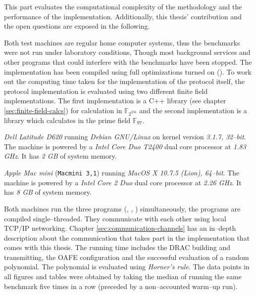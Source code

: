 \label{sec:evaluation}

This part evaluates the computational complexity of the methodology and the
performance of the implementation. Additionally, this thesis' contribution and
the open questions are exposed in the following.

%
%
\label{sec:test-setup}

\label{sec:test-machines}

Both test machines are regular home computer systems, thus the benchmarks were
not run under laboratory conditions, Though most background services and other
programs that could interfere with the benchmarks have been stopped. The
implementation has been compiled using full optimizations turned on
(). To work out the computing time
taken for the implementation of the protocol itself, the protocol implementation
is evaluated using two different finite field implementations.
The first implementation is a C++ library (see chapter
\ref{sec:finite-field-calcs}) for calculation in $\mathbb{F}_{2^{256}}$ and the
second implementation is a \JWThaskell{} library which calculates in the prime
field $\mathbb{F}_{97}$.



\emph{Dell Latitude D620} running \emph{Debian GNU/Linux} on kernel version
\emph{3.1.7, 32--bit}. The machine is powered by a \emph{Intel\TReg{} Core Duo
T2400} dual core processor at \emph{1.83 GHz}. It has \emph{2 GB} of system
memory.



\emph{Apple Mac mini} (\texttt{Macmini 3,1}) running \emph{MacOS X 10.7.5
(Lion), 64--bit}. The machine is powered by a \emph{Intel\TReg{} Core 2 Duo}
dual core processor at \emph{2.26 GHz}. It has \emph{8 GB} of system memory.


Both machines run the three programs (\JWBpOne{}, \JWBpTwo{}, \JWBtoken{})
simultaneously, the programs are compiled single--threaded. They
communicate with each other using local TCP/IP networking. Chapter
\ref{sec:communication-channels} has an in--depth description about the
communication that takes part in the implementation that comes with this thesis.
The running time includes the DRAC building and transmitting, the OAFE
configuration and the successful evaluation of a random polynomial. The
polynomial is evaluated using \emph{Horner's rule}\cite{cormen01}. The data
points in all figures and tables were obtained by taking the median of
running the same benchmark five times in a row (preceded by a non--accounted
warm--up run).



